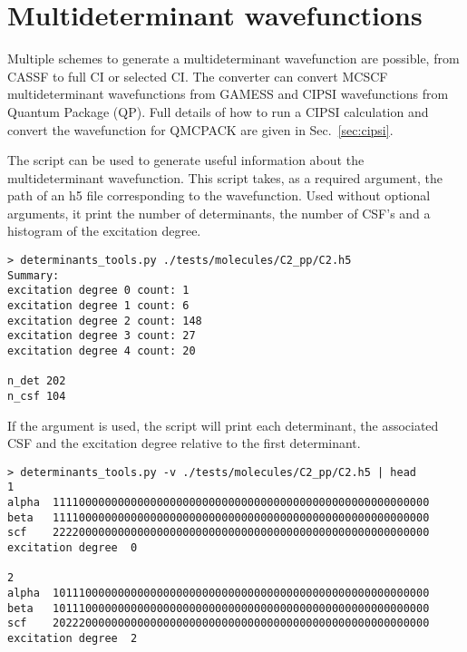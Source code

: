 \section{Multideterminant wavefunctions}
\label{sec:multideterminants}
Multiple schemes to generate a multideterminant wavefunction are
possible, from CASSF to full CI or selected CI. The \qmcpack converter can
convert MCSCF multideterminant wavefunctions from
GAMESS\cite{schmidt93} and CIPSI\cite{Caffarel2013} wavefunctions from
Quantum Package\cite{QP} (QP). Full details of how to run a CIPSI
calculation and convert the wavefunction for QMCPACK are given in 
Sec.~\ref{sec:cipsi}.

The script  can be used to generate
useful information about the multideterminant wavefunction. This script takes, as a required argument, the path of an h5 file corresponding to the wavefunction. Used without optional arguments, it print the number of determinants, the number of CSF's and a histogram of the excitation degree.

\begin{lstlisting}[style=SHELL]
> determinants_tools.py ./tests/molecules/C2_pp/C2.h5
Summary:
excitation degree 0 count: 1
excitation degree 1 count: 6
excitation degree 2 count: 148
excitation degree 3 count: 27
excitation degree 4 count: 20

n_det 202
n_csf 104
\end{lstlisting}

If the  argument is used, the script will print each determinant,
the associated CSF and the excitation degree relative to the first determinant.
\begin{lstlisting}[style=SHELL]
> determinants_tools.py -v ./tests/molecules/C2_pp/C2.h5 | head
1
alpha  1111000000000000000000000000000000000000000000000000000000
beta   1111000000000000000000000000000000000000000000000000000000
scf    2222000000000000000000000000000000000000000000000000000000
excitation degree  0

2
alpha  1011100000000000000000000000000000000000000000000000000000
beta   1011100000000000000000000000000000000000000000000000000000
scf    2022200000000000000000000000000000000000000000000000000000
excitation degree  2
\end{lstlisting}
